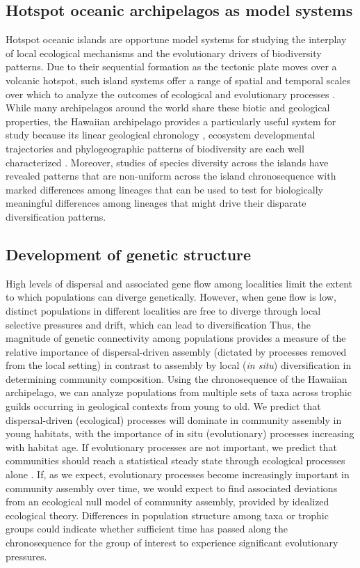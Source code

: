 \subsection{Hotspot oceanic archipelagos as model systems}

Hotspot oceanic islands are opportune model systems for studying the
interplay of local ecological mechanisms and the evolutionary drivers
of biodiversity patterns. Due to their sequential formation as the
tectonic plate moves over a volcanic hotspot, such island systems
offer a range of spatial and temporal scales over which to analyze the
outcomes of ecological and evolutionary processes
\citep{warren2015}. While many archipelagos around the world share
these biotic and geological properties, the Hawaiian archipelago
provides a particularly useful system for study because its linear
geological chronology \citep{price2002}, ecosystem developmental
trajectories \citep{vitousek2004} and phylogeographic patterns of
biodiversity are each well characterized \citep{wagner1995}. Moreover,
studies of species diversity across the islands have revealed patterns
that are non-uniform across the island chronosequence with marked
differences among lineages \citep[e.g.][]{gruner2007, gillespie2009}
that can be used to test for biologically meaningful differences among
lineages that might drive their disparate diversification patterns.

\subsection{Development of genetic structure}

High levels of dispersal and associated gene flow among localities
limit the extent to which populations can diverge
genetically. However, when gene flow is low, distinct populations in
different localities are free to diverge through local selective
pressures and drift, which can lead to diversification
\citep{slatkin1987} Thus, the magnitude of genetic connectivity among
populations provides a measure of the relative importance of
dispersal-driven assembly (dictated by processes removed from the
local setting) in contrast to assembly by local (\textit{in situ})
diversification in determining community composition. Using the
chronosequence of the Hawaiian archipelago, we can analyze populations
from multiple sets of taxa across trophic guilds occurring in
geological contexts from young to old. We predict that
dispersal-driven (ecological) processes will dominate in community
assembly in young habitats, with the importance of in situ
(evolutionary) processes increasing with habitat age. If evolutionary
processes are not important, we predict that communities should reach
a statistical steady state through ecological processes alone
\citep{harte2011}. If, as we expect, evolutionary processes become
increasingly important in community assembly over time, we would
expect to find associated deviations from an ecological null model of
community assembly, provided by idealized ecological
theory. Differences in population structure among taxa or trophic
groups could indicate whether sufficient time has passed along the
chronosequence for the group of interest to experience significant
evolutionary pressures.


